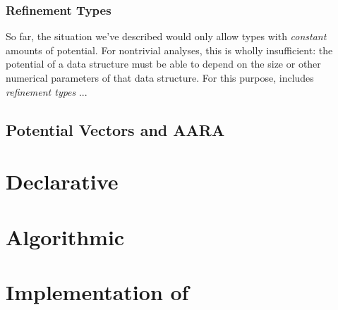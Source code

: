 \subsubsection{Refinement Types}
So far, the situation we've described would only allow types with \textit{constant} amounts of potential. For nontrivial analyses, this is wholly insufficient: the potential of a data structure must be able to depend on the size or other numerical parameters of that data structure. For this purpose, \lambdaamor includes \textit{refinement types} \citehere...


\subsection{Potential Vectors and AARA}

\section{Declarative \lambdaamor}
\section{Algorithmic \lambdaamor}
\section{Implementation of \lambdaamor}
